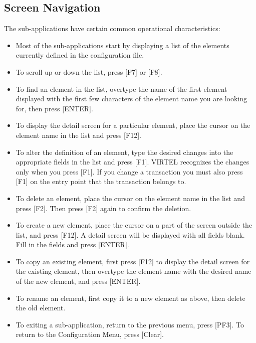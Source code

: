 \documentclass[letterpaper,10pt,english]{sphinxmanual}
\begin{document}

\subsection{Screen Navigation}
\label{\detokenize{connectivity_guide:screen-navigation}}\label{\detokenize{connectivity_guide:index-3}}
The sub-applications have certain common operational characteristics:
\begin{itemize}
\item {} 
Most of the sub-applications start by displaying a list of the elements currently defined in the configuration file.

\item {} 
To scroll up or down the list, press {[}F7{]} or {[}F8{]}.

\item {} 
To find an element in the list, overtype the name of the first element displayed with the first few characters of the element name you are looking for, then press {[}ENTER{]}.

\item {} 
To display the detail screen for a particular element, place the cursor on the element name in the list and press {[}F12{]}.

\item {} 
To alter the definition of an element, type the desired changes into the appropriate fields in the list and press {[}F1{]}. VIRTEL recognizes the changes only when you press {[}F1{]}. If you change a transaction you must also press {[}F1{]} on the entry point that the transaction belongs to.

\item {} 
To delete an element, place the cursor on the element name in the list and press {[}F2{]}. Then press {[}F2{]} again to confirm the deletion.

\item {} 
To create a new element, place the cursor on a part of the screen outside the list, and press {[}F12{]}. A detail screen will be displayed with all fields blank. Fill in the fields and press {[}ENTER{]}.

\item {} 
To copy an existing element, first press {[}F12{]} to display the detail screen for the existing element, then overtype the element name with the desired name of the new element, and press {[}ENTER{]}.

\item {} 
To rename an element, first copy it to a new element as above, then delete the old element.

\item {} 
To exiting a sub-application, return to the previous menu, press {[}PF3{]}. To return to the Configuration Menu, press {[}Clear{]}.

\end{itemize}
\end{document}
